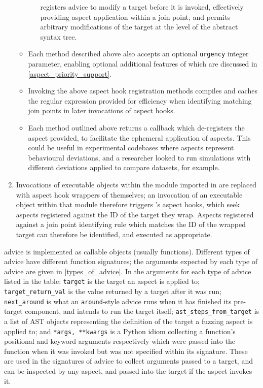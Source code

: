 \begin{enumerate}
\begin{itemize}
\begin{enumerate}
            registers advice to modify a target before it is invoked,
            effectively providing aspect application within a join point, and
            permits arbitrary modifications of the target at the level of the
            abstract syntax tree.
        \end{enumerate}
        \item Each method described above also accepts an optional
        \lstinline{urgency} integer parameter, enabling optional additional
        features of \pdsf which are discussed in \cref{aspect_priority_support}.
        \item Invoking the above aspect hook registration methods compiles and
        caches the regular expression provided for efficiency when identifying
        matching join points in later invocations of aspect hooks.
        \item Each method outlined above returns a callback which de-registers
        the aspect provided, to facilitate the ephemeral application of aspects.
        This could be useful in experimental codebases where aspects represent
        behavioural deviations, and a researcher looked to run simulations with
        different deviations applied to compare datasets, for example.
    \end{itemize}
    \item Invocations of executable objects within the module imported in
     are replaced with aspect hook wrappers of themselves; an
    invocation of an executable object within that module therefore triggers
    \pdsf{}'s aspect hooks, which seek aspects registered against the ID of the
    target they wrap. Aspects registered against a join point identifying rule
    which matches the ID of the wrapped target can therefore be identified, and
    executed as appropriate.
\end{enumerate}

\pdsf{} advice is implemented as callable objects (usually functions). Different
types of advice have different function signatures; the arguments expected by
each type of advice are given in \cref{types_of_advice}. In the arguments for
each type of advice listed in the table: \lstinline{target} is the target an
aspect is applied to; \lstinline{target_return_val} is the value returned by a
target after it was run; \lstinline{next_around} is what an
\lstinline{around}-style advice runs when it has finished its pre-target
component, and intends to run the target itself;
\lstinline{ast_steps_from_target} is a list of AST objects representing the
definition of the target a fuzzing aspect is applied to; and
\lstinline{*args,}~\lstinline{**kwargs} is a Python idiom collecting a
function's positional and keyword arguments respectively which were passed into
the function when it was invoked but was not specified within its signature.
These are used in the signatures of advice to collect arguments passed to a
target, and can be inspected by any aspect, and passed into the target if the
aspect invokes it.

